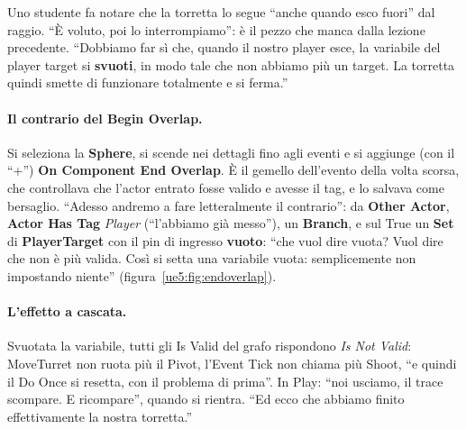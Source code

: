 Uno studente fa notare che la torretta lo segue ``anche quando esco fuori'' dal raggio.
``È voluto, poi lo interrompiamo'': è il pezzo che manca dalla lezione precedente.
``Dobbiamo far sì che, quando il nostro player esce, la variabile del player target si
\textbf{svuoti}, in modo tale che non abbiamo più un target. La torretta quindi smette di
funzionare totalmente e si ferma.''

\paragraph{Il contrario del Begin Overlap.} Si seleziona la \textbf{Sphere}, si scende
nei dettagli fino agli eventi e si aggiunge (con il ``+'') \textbf{On Component End
Overlap}. È il gemello dell'evento della volta scorsa, che controllava che l'actor
entrato fosse valido e avesse il tag, e lo salvava come bersaglio. ``Adesso andremo a
fare letteralmente il contrario'': da \textbf{Other Actor}, \textbf{Actor Has Tag}
\emph{Player} (``l'abbiamo già messo''), un \textbf{Branch}, e sul True un \textbf{Set}
di \textbf{PlayerTarget} con il pin di ingresso \textbf{vuoto}: ``che vuol dire vuota?
Vuol dire che non è più valida. Così si setta una variabile vuota: semplicemente non
impostando niente'' (figura~\ref{ue5:fig:endoverlap}).

\paragraph{L'effetto a cascata.} Svuotata la variabile, tutti gli Is Valid del grafo
rispondono \emph{Is Not Valid}: MoveTurret non ruota più il Pivot, l'Event Tick non
chiama più Shoot, ``e quindi il Do Once si resetta, con il problema di prima''. In Play:
``noi usciamo, il trace scompare. E ricompare'', quando si rientra. ``Ed ecco che abbiamo
finito effettivamente la nostra torretta.''

